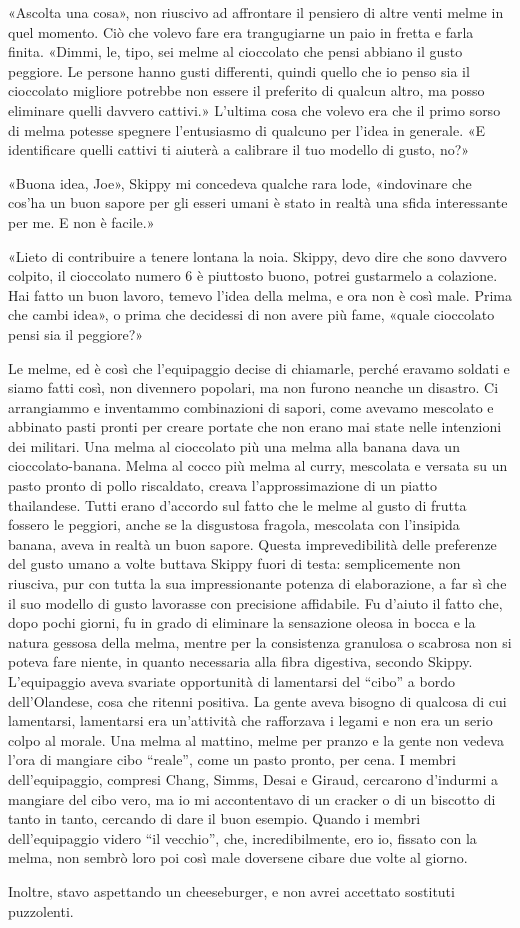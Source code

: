 «Ascolta una cosa», non riuscivo ad affrontare il pensiero di altre
venti melme in quel momento. Ciò che volevo fare era trangugiarne un
paio in fretta e farla finita. «Dimmi, le, tipo, sei melme al cioccolato
che pensi abbiano il gusto peggiore. Le persone hanno gusti differenti,
quindi quello che io penso sia il cioccolato migliore potrebbe non
essere il preferito di qualcun altro, ma posso eliminare quelli davvero
cattivi.» L'ultima cosa che volevo era che il primo sorso di melma
potesse spegnere l'entusiasmo di qualcuno per l'idea in generale. «E
identificare quelli cattivi ti aiuterà a calibrare il tuo modello di
gusto, no?»

«Buona idea, Joe», Skippy mi concedeva qualche rara lode, «indovinare
che cos'ha un buon sapore per gli esseri umani è stato in realtà una
sfida interessante per me. E non è facile.»

«Lieto di contribuire a tenere lontana la noia. Skippy, devo dire che
sono davvero colpito, il cioccolato numero 6 è piuttosto buono, potrei
gustarmelo a colazione. Hai fatto un buon lavoro, temevo l'idea della
melma, e ora non è così male. Prima che cambi idea», o prima che
decidessi di non avere più fame, «quale cioccolato pensi sia il
peggiore?»

Le melme, ed è così che l'equipaggio decise di chiamarle, perché eravamo
soldati e siamo fatti così, non divennero popolari, ma non furono
neanche un disastro. Ci arrangiammo e inventammo combinazioni di sapori,
come avevamo mescolato e abbinato pasti pronti per creare portate che
non erano mai state nelle intenzioni dei militari. Una melma al
cioccolato più una melma alla banana dava un cioccolato-banana. Melma al
cocco più melma al curry, mescolata e versata su un pasto pronto di
pollo riscaldato, creava l'approssimazione di un piatto thailandese.
Tutti erano d'accordo sul fatto che le melme al gusto di frutta fossero
le peggiori, anche se la disgustosa fragola, mescolata con l'insipida
banana, aveva in realtà un buon sapore. Questa imprevedibilità delle
preferenze del gusto umano a volte buttava Skippy fuori di testa:
semplicemente non riusciva, pur con tutta la sua impressionante potenza
di elaborazione, a far sì che il suo modello di gusto lavorasse con
precisione affidabile. Fu d'aiuto il fatto che, dopo pochi giorni, fu in
grado di eliminare la sensazione oleosa in bocca e la natura gessosa
della melma, mentre per la consistenza granulosa o scabrosa non si
poteva fare niente, in quanto necessaria alla fibra digestiva, secondo
Skippy. L'equipaggio aveva svariate opportunità di lamentarsi del
``cibo'' a bordo dell'Olandese, cosa che ritenni positiva. La gente
aveva bisogno di qualcosa di cui lamentarsi, lamentarsi era un'attività
che rafforzava i legami e non era un serio colpo al morale. Una melma al
mattino, melme per pranzo e la gente non vedeva l'ora di mangiare cibo
``reale'', come un pasto pronto, per cena. I membri dell'equipaggio,
compresi Chang, Simms, Desai e Giraud, cercarono d'indurmi a mangiare
del cibo vero, ma io mi accontentavo di un cracker o di un biscotto di
tanto in tanto, cercando di dare il buon esempio. Quando i membri
dell'equipaggio videro ``il vecchio'', che, incredibilmente, ero io,
fissato con la melma, non sembrò loro poi così male doversene cibare due
volte al giorno.

Inoltre, stavo aspettando un cheeseburger, e non avrei accettato
sostituti puzzolenti.